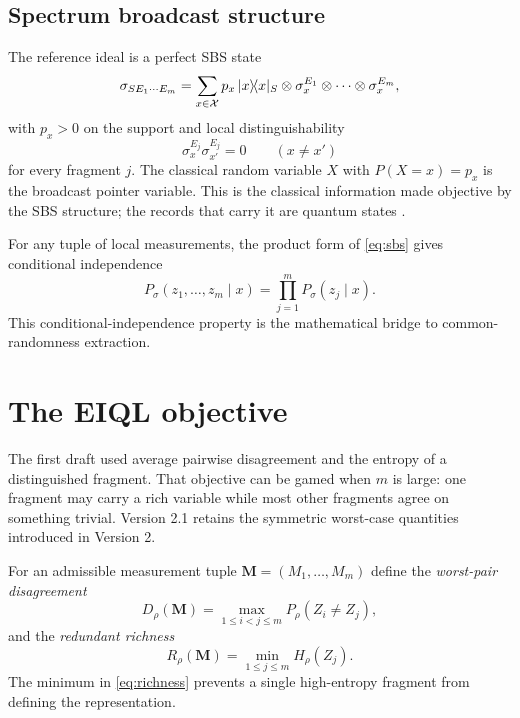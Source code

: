 \subsection{Spectrum broadcast structure}

The reference ideal is a perfect SBS state
\begin{equation}
\sigma_{SE_1\cdots E_m}
=\sum_{x\in\mathcal{X}}p_x\,|x\rangle\!\langle x|_S\otimes
\sigma_x^{E_1}\otimes\cdots\otimes\sigma_x^{E_m},
\label{eq:sbs}
\end{equation}
with $p_x>0$ on the support and local distinguishability
\begin{equation}
\sigma_x^{E_j}\sigma_{x'}^{E_j}=0\qquad (x\ne x')
\label{eq:orth}
\end{equation}
for every fragment $j$. The classical random variable $X$ with $P(X=x)=p_x$ is the broadcast pointer variable. This is the classical information made objective by the SBS structure; the records that carry it are quantum states \cite{horodecki2015,korbicz2021}.

For any tuple of local measurements, the product form of \cref{eq:sbs} gives conditional independence
\begin{equation}
P_\sigma(z_1,\ldots,z_m\mid x)=\prod_{j=1}^m P_\sigma(z_j\mid x).
\label{eq:condind}
\end{equation}
This conditional-independence property is the mathematical bridge to common-randomness extraction.

\section{The EIQL objective}

The first draft used average pairwise disagreement and the entropy of a distinguished fragment. That objective can be gamed when $m$ is large: one fragment may carry a rich variable while most other fragments agree on something trivial. Version 2.1 retains the symmetric worst-case quantities introduced in Version 2.

For an admissible measurement tuple $\mathbf M=(M_1,\ldots,M_m)$ define the \emph{worst-pair disagreement}
\begin{equation}
D_\rho(\mathbf M)=\max_{1\le i<j\le m}P_\rho(Z_i\ne Z_j),
\label{eq:disagree}
\end{equation}
and the \emph{redundant richness}
\begin{equation}
R_\rho(\mathbf M)=\min_{1\le j\le m}H_\rho(Z_j).
\label{eq:richness}
\end{equation}
The minimum in \cref{eq:richness} prevents a single high-entropy fragment from defining the representation.

